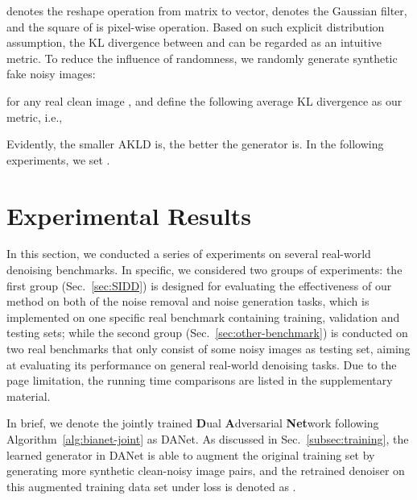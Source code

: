 \documentclass[runningheads]{llncs}
\newenvironment{shrinkeq}[2]
{ \bgroup
  \addtolength\abovedisplayshortskip{#1}
  \addtolength\abovedisplayskip{#1}
  \addtolength\belowdisplayshortskip{#2}
  \addtolength\belowdisplayskip{#2}}
{\egroup\ignorespacesafterend}
\begin{document}
\begin{itemize}
\begin{small}
        \end{small}
        \hspace{-1mm} denotes the reshape operation from matrix to vector,  denotes the Gaussian filter, 
        and the square of  is pixel-wise operation.
        Based on such explicit distribution assumption, the KL divergence between  and
         can be regarded as an intuitive metric. To reduce the influence of randomness,
        we randomly generate  synthetic fake noisy images:
        \begin{small}
        
        \end{small}
        \hspace{-1mm}for any real clean image , and define the following average KL divergence as our metric, i.e.,
        \begin{small}
        \begin{shrinkeq}{-1mm}{-2mm}
        
        \end{shrinkeq}
        \end{small}
        \hspace{-1mm}Evidently, the smaller AKLD is, the better the generator  is. In the following experiments, we set 
        .
\end{itemize}

\section{Experimental Results} \label{sec:Experiments}

In this section, we conducted a series of experiments on several real-world denoising benchmarks.
In specific, we considered two groups of experiments:
the first group (Sec.~\ref{sec:SIDD}) is designed for evaluating
the effectiveness of our method on both of the noise removal and noise generation tasks, which is implemented
on one specific real benchmark containing training, validation and testing sets; while the second
group (Sec.~\ref{sec:other-benchmark}) is conducted on two real benchmarks that only consist of some noisy
images as testing set, aiming at evaluating its performance on general real-world denoising tasks.
Due to the page limitation, the running time comparisons are listed in the supplementary material.

In brief, we denote the jointly trained \textbf{D}ual \textbf{A}dversarial \textbf{Net}work following
Algorithm~\ref{alg:bianet-joint} as DANet. As discussed in Sec.~\ref{subsec:training}, the learned
generator  in DANet is able to augment the original
training set by generating more synthetic clean-noisy image pairs, and the retrained denoiser  on this 
augmented training data set under  loss is denoted as .
\end{document}
